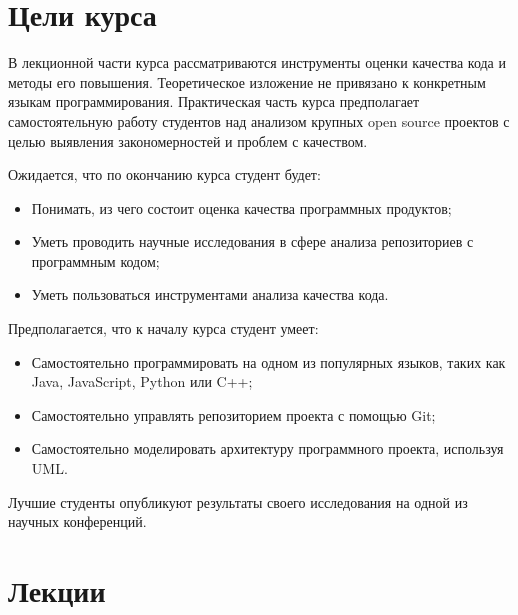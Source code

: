 \documentclass[nobrand,anonymous,nodate,nosecurity]{huawei}
\begin{document}
{\section{Цели курса}

В лекционной части курса рассматриваются инструменты оценки качества кода и методы его повышения. Теоретическое изложение не привязано к конкретным языкам программирования. Практическая часть курса предполагает самостоятельную работу студентов над анализом крупных open source проектов с целью выявления закономерностей и проблем с качеством.

Ожидается, что по окончанию курса студент будет:
\begin{itemize}
    \item Понимать, из чего состоит оценка качества программных продуктов;
    \item Уметь проводить научные исследования в сфере анализа репозиториев с программным кодом;
    \item Уметь пользоваться инструментами анализа качества кода.
\end{itemize}

Предполагается, что к началу курса студент умеет:
\begin{itemize}
    \item Самостоятельно программировать на одном из популярных языков, таких как Java, JavaScript, Python или C++;
    \item Самостоятельно управлять репозиторием проекта с помощью Git;
    \item Самостоятельно моделировать архитектуру программного проекта, используя UML.
\end{itemize}

Лучшие студенты опубликуют результаты своего исследования на одной из научных конференций.

\section{Лекции}

}
\end{document}
